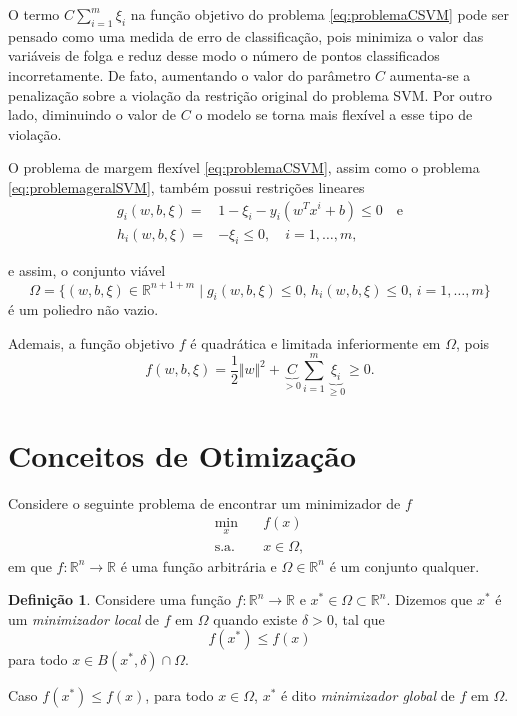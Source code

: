 \documentclass[12pt,a4paper]{scrartcl}
\def\RR{\mathds{R}}
\theoremstyle{definition}%
\newtheorem{defi}{Definição}
\begin{document}
O termo $C \sum_{i=1}^{m} \xi_{i}$ na função objetivo do problema \eqref{eq:problemaCSVM} pode ser pensado como uma medida de erro de classificação, pois minimiza o valor das variáveis de folga e reduz desse modo o número de pontos classificados incorretamente. De fato, aumentando o valor do parâmetro $C$ aumenta-se a penalização sobre a violação da restrição original do problema SVM. Por outro lado, diminuindo o valor de $C$ o modelo se torna mais flexível a esse tipo de violação. 

O problema de margem flexível \eqref{eq:problemaCSVM}, assim como o problema \eqref{eq:problemageralSVM}, também possui restrições lineares 
\begin{align} 
g_{i}(w,b,\xi) = & 1-\xi_{i} - y_i(w^{T}x^{i}+b) \leq 0 \quad \text{e} \\
h_{i}(w,b,\xi) = & - \xi_{i} \leq 0, \quad i=1, \ldots, m,
\end{align}

e assim, o conjunto viável
\[
\Omega = \{(w,b,\xi) \in \RR^{n+1+m} \mid g_{i}(w,b,\xi) \leq 0, \, h_{i}(w,b,\xi) \leq 0, \, i=1, \ldots, m \} 
\]
é um poliedro não vazio.

Ademais, a função objetivo $f$ é quadrática e limitada inferiormente em $\Omega$, pois 
\[
f(w,b,\xi) = \dfrac{1}{2} \Vert w\Vert^{2} + \underbrace{C}_{> 0} \sum_{i=1}^{m} \underbrace{\xi_{i}}_{\geq 0} \geq 0.
\]



\section{Conceitos de Otimização}

Considere o seguinte problema de encontrar um minimizador de $f$
\[ \label{problema_geral_otimizacao}
\begin{aligned}
\min_{x} & \quad f(x) \\
\text{s.a.} & \quad x \in \Omega ,
\end{aligned}
\]
em que $f: \RR^{n} \rightarrow \RR$ é uma função arbitrária e $\Omega \in \RR^{n}$ é um conjunto qualquer.


\begin{defi} \label{defi:definicao_minimizador}
Considere uma função $f:\RR^{n} \rightarrow \RR$ e $x^{*} \in \Omega \subset \RR^{n}$. Dizemos que $x^{*}$ é um \emph{minimizador local} de $f$ em $\Omega$ quando existe $\delta >0$, tal que 
\[
f(x^{*}) \leq f(x)
\]
para todo $x \in B(x^{*}, \delta) \cap \Omega $. 

Caso $f(x^{*}) \leq f(x)$, para todo $x \in \Omega$, $x^{*}$ é dito \emph{minimizador global} de $f$ em $\Omega$.
\end{defi}
\end{document}
